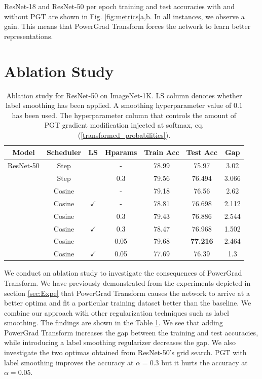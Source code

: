 \documentclass[times,sort&compress]{elsarticle}
\begin{document}
ResNet-18 and ResNet-50 per epoch training and test accuracies with and without PGT are
shown in Fig. \ref{fig:metrics}a,b. In all instances, we observe a gain. This means that
PowerGrad Transform forces the network to learn better representations.


\section{Ablation Study}
\label{sec:Abla}


\begin{table}[t]
\centering
\caption{ Ablation study for ResNet-50 on ImageNet-1K. LS column denotes whether label
smoothing has been applied. A smoothing hyperparameter value of $0.1$ has been used. The
hyperparameter column that controls the amount of PGT gradient modification injected at
softmax, eq. (\ref{transformed_probabilities}). }
\label{tab:ablation_table}
\vspace{5pt}
\begin{tabular}{ccccccc}
\textbf{Model} & \textbf{Scheduler} & \textbf{LS} & \textbf{Hparams} & \textbf{Train
Acc} & \textbf{Test Acc} & \textbf{Gap} \\
\midrule
ResNet-50 & Step &  & - & 78.99 & 75.97 & 3.02 \\
& Step &  & 0.3 & 79.56 & 76.494 & 3.066 \\
& Cosine &  & - & 79.18 & 76.56 & 2.62 \\
& Cosine & $\checkmark$ & - & 78.81 & 76.698 & 2.112 \\
& Cosine &  & 0.3 & 79.43 & 76.886 & 2.544 \\
& Cosine & $\checkmark$ & 0.3 & 78.47 & 76.968 & 1.502 \\
& Cosine &  & 0.05 & 79.68 & \textbf{77.216} & 2.464 \\
& Cosine & $\checkmark$ & 0.05 & 77.69 & 76.39 & 1.3 \\
\end{tabular}
\end{table}




We conduct an ablation study to investigate the consequences of PowerGrad Transform. We
have previously demonstrated from the experiments depicted in section \ref{sec:Expe}
that PowerGrad Transform causes the network to arrive at a better optima and fit a
particular training dataset better than the baseline. We combine our approach with other
regularization techniques such as label smoothing. The findings are shown in the Table
\ref{tab:ablation_table}. We see that adding PowerGrad Transform increases the gap
between the training and test accuracies, while introducing a label smoothing
regularizer decreases the gap. We also investigate the two optimas obtained from
ResNet-50's grid search. PGT with label smoothing improves the accuracy at $\alpha=0.3$
but it hurts the accuracy at $\alpha=0.05$.
\end{document}
